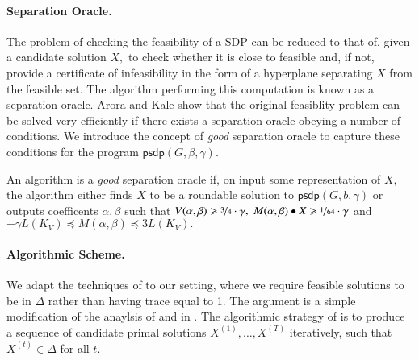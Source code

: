 \documentclass[twoside,leqno,twocolumn]{article}
\newcommand{\nfrac}{\nicefrac}
\renewcommand{\leq}{\leqslant}
\renewcommand{\geq}{\geqslant}
\newcommand{\sdp}{{\sf sdp}}
\newcommand{\SDP}{{\sf SDP}\xspace}
\numberwithin{equation}{section}
\newcommand{\psdp}{{\ensuremath{{\mathsf{psdp}}}\xspace}}
\begin{document}
\paragraph{Separation Oracle.} The problem of checking the feasibility of a {\SDP} can be reduced to that of, given a candidate solution $X,$ to check whether it is close to feasible and, if not, provide a certificate of infeasibility in the form of a hyperplane separating $X$ from the feasible set. The algorithm performing this computation is known as a separation oracle. 
Arora and Kale show that the original feasiblity problem can be solved very efficiently if there exists a separation oracle obeying a number of conditions. We introduce the concept of {\it good} separation oracle to capture these conditions for the program $\psdp(G,\beta, \gamma).$

\begin{Definition} An algorithm is a {\it good} separation oracle if, on input some representation of $X,$ the algorithm either finds $X$ to be a  roundable solution to $\psdp(G, b, \gamma)$ or outputs coefficents $\alpha, \beta$ such that $V(\alpha, \beta) \geq \nfrac{3}{4} \cdot \gamma,$  $M(\alpha, \beta) \bullet X \geq \nfrac{1}{64} \cdot \gamma$ and $ -\gamma L(K_V) \preceq  M(\alpha, \beta) \preceq 3 L(K_V).$
\end{Definition}

\begin{comment}
More formally \Authormarginnote{Lorenzo}{and specifically to our case, must emphasize otherwise confusing, must say slight modification, these are our defintions}, let $F_\gamma$ be the set of feasible solutions to $\sdp_b(G).$  A $\delta$-separation oracle is an algorithm that, given $X \in \Delta$ as input, checks wether $X$ is "close" to $F_\gamma.$ In our case, $X$ is considered "close" to $F_\gamma$ if it can be rounded w.h.p. to produce a $\Omega_b(1)$-balanced cut of conductance $O_b(\sqrt{\gamma}).$
If $X$ is not "close" to $F_\gamma,$ a $\delta$-separation oracle exhibits a separating hyperplane by outputing $\alpha, \beta$ such that $V(\alpha, \beta) \geq \gamma$ and $M(\alpha, \beta) \bullet X \geq \delta.$
A separation oracle has $(\ell, \rho)$ width if, in the case that $X$ is not "close" to $F_\gamma,$ the output coefficents $\alpha, \beta$ obey $\ell \cdot L(K_V) \leq M(\alpha, \beta) \leq \rho \cdot L(K_V).$
\end{comment}

\paragraph{Algorithmic Scheme.} 
We adapt the techniques of \cite{AK} to our setting, where we require feasible solutions to be in $\Delta$ rather than having trace equal to 1.  The argument is a simple modification of the anaylsis of \cite{AK} and in \cite{Steurer}.
The algorithmic strategy of \cite{AK} is to produce a sequence of candidate primal solutions $X^{(1)}, \ldots, X^{(T)}$ iteratively, such that $X^{(t)}  \in \Delta$ for all $t.$ 
\end{document}
